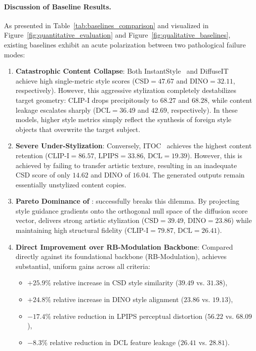 \paragraph{Discussion of Baseline Results.}
As presented in Table~\ref{tab:baselines_comparison} and visualized in Figure~\ref{fig:quantitative_evaluation} and Figure~\ref{fig:qualitative_baselines}, existing baselines exhibit an acute polarization between two pathological failure modes:
\begin{enumerate}
    \item \textbf{Catastrophic Content Collapse}: Both InstantStyle~\cite{wang2024instantstyle} and DiffuseIT~\cite{kwon2023diffuseit} achieve high single-metric style scores ($\text{CSD} = 47.67$ and $\text{DINO} = 32.11$, respectively). However, this aggressive stylization completely destabilizes target geometry: CLIP-I drops precipitously to $68.27$ and $68.28$, while content leakage escalates sharply ($\text{DCL} = 36.49$ and $42.69$, respectively). In these models, higher style metrics simply reflect the synthesis of foreign style objects that overwrite the target subject.
    \item \textbf{Severe Under-Stylization}: Conversely, ITOC~\cite{itoc2024} achieves the highest content retention ($\text{CLIP-I} = 86.57$, $\text{LPIPS} = 33.86$, $\text{DCL} = 19.39$). However, this is achieved by failing to transfer artistic texture, resulting in an inadequate CSD score of only $14.62$ and DINO of $16.04$. The generated outputs remain essentially unstylized content copies.
    \item \textbf{Pareto Dominance of \method}: \method successfully breaks this dilemma. By projecting style guidance gradients onto the orthogonal null space of the diffusion score vector, \method delivers strong artistic stylization ($\text{CSD} = 39.49$, $\text{DINO} = 23.86$) while maintaining high structural fidelity ($\text{CLIP-I} = 79.87$, $\text{DCL} = 26.41$).
    \item \textbf{Direct Improvement over RB-Modulation Backbone}: Compared directly against its foundational backbone (RB-Modulation), \method achieves substantial, uniform gains across all criteria:
    \begin{itemize}
        \item $+25.9\%$ relative increase in CSD style similarity ($39.49$ vs. $31.38$),
        \item $+24.8\%$ relative increase in DINO style alignment ($23.86$ vs. $19.13$),
        \item $-17.4\%$ relative reduction in LPIPS perceptual distortion ($56.22$ vs. $68.09$),
        \item $-8.3\%$ relative reduction in DCL feature leakage ($26.41$ vs. $28.81$).
    \end{itemize}
\end{enumerate}

